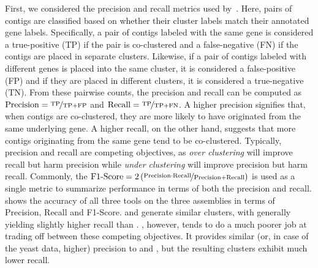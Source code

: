 First, we considered the precision and recall metrics used by~\citet{corset}.  Here, pairs of contigs are classified based on whether their cluster labels match their annotated gene labels.  Specifically, a pair of contigs labeled with the same gene is considered a true-positive (TP) if the pair is co-clustered and a false-negative (FN) if the contigs are placed in separate clusters.  Likewise, if a pair of contigs labeled with different genes is placed into the same cluster, it is considered a false-positive (FP) and if they are placed in different clusters, it is considered a true-negative (TN).  From these pairwise counts, the precision and recall can be computed as $\text{Precision} = \nicefrac{\text{TP}}{\text{TP}+\text{FP}}$ and $\text{Recall} = \nicefrac{\text{TP}}{\text{TP}+\text{FN}}$.  A higher precision signifies that, when contigs are co-clustered, they are more likely to have originated from the same underlying gene.  A higher recall, on the other hand, suggests that more contigs originating from the same gene tend to be co-clustered.  Typically, precision and recall are competing objectives, as \textit{over clustering} will improve recall but harm precision while \textit{under clustering} will improve precision but harm recall.  Commonly, the $\text{F1-Score} = 2 \left(\nicefrac{\text{Precision} \cdot \text{Recall}}{\text{Precision} + \text{Recall}}\right)$ is used as a single metric to summarize performance in terms of both the precision and recall.  shows the accuracy of all three tools on the three assemblies in terms of Precision, Recall and F1-Score.  \corset and \rapclust generate similar clusters, with \rapclust generally yielding slightly higher recall than \corset.  \cdhit, however, tends to do a much poorer job at trading off between these competing objectives.  It provides similar (or, in case of the yeast data, higher) precision to \corset and \rapclust, but the resulting clusters exhibit much lower recall.

